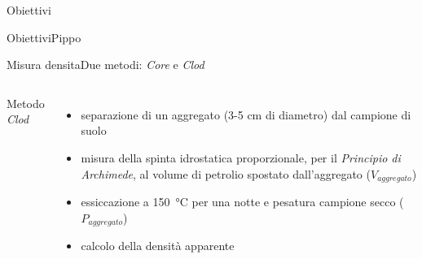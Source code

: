 \documentclass[10pt]{beamer}
\begin{document}
\begin{frame}{Obiettivi}
\begin{frame}{Obiettivi}{Pippo}
\begin{frame}{Misura densita}{Due metodi: \emph{Core} e \emph{Clod}}
  \begin{columns}[c]
     Metodo \emph{Clod}
    \pause
    \begin{itemize}[<+->]
    \item separazione di un aggregato (3-5 cm di diametro) dal
      campione di suolo
    \item misura della spinta idrostatica proporzionale, per il
      \emph{Principio di Archimede}, al volume di petrolio spostato
      dall'aggregato ($V_{aggregato}$)
    \item essiccazione a \SI{150}{\celsius} per una notte e pesatura campione
      secco ($P_{aggregato}$)
    \item calcolo della densit\`a apparente
    \end{itemize}

\end{columns}
\end{frame}
\end{frame}
\end{frame}
\end{document}
